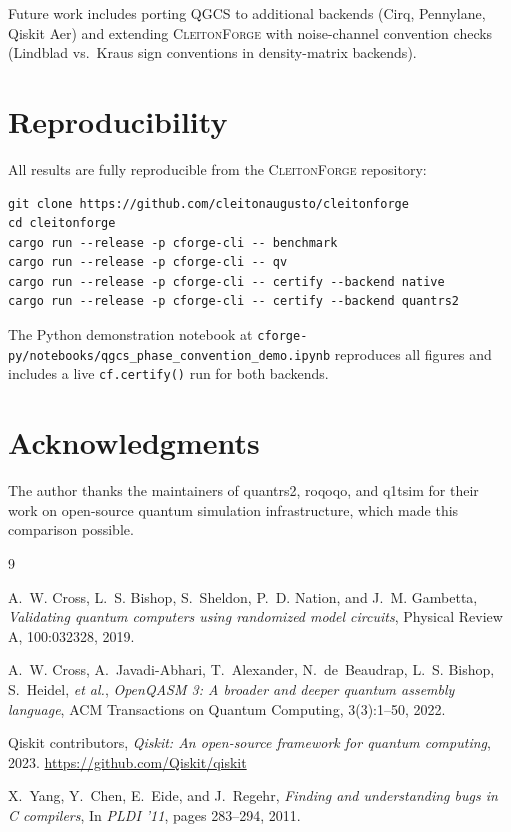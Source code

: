 \documentclass[11pt,a4paper]{article}
\begin{document}
Future work includes porting QGCS to additional backends (Cirq, Pennylane,
Qiskit Aer) and extending \textsc{CleitonForge} with noise-channel convention
checks (Lindblad vs.\ Kraus sign conventions in density-matrix backends).

\section*{Reproducibility}

All results are fully reproducible from the \textsc{CleitonForge} repository:

\begin{lstlisting}[style=rust]
git clone https://github.com/cleitonaugusto/cleitonforge
cd cleitonforge
cargo run --release -p cforge-cli -- benchmark
cargo run --release -p cforge-cli -- qv
cargo run --release -p cforge-cli -- certify --backend native
cargo run --release -p cforge-cli -- certify --backend quantrs2
\end{lstlisting}

The Python demonstration notebook at
\texttt{cforge-py/notebooks/qgcs\_phase\_convention\_demo.ipynb} reproduces
all figures and includes a live \texttt{cf.certify()} run for both backends.

\section*{Acknowledgments}

The author thanks the maintainers of quantrs2, roqoqo, and q1tsim for their
work on open-source quantum simulation infrastructure, which made this
comparison possible.


\begin{thebibliography}{9}

A.~W. Cross, L.~S. Bishop, S.~Sheldon, P.~D. Nation, and J.~M. Gambetta,
\emph{Validating quantum computers using randomized model circuits},
Physical Review A, 100:032328, 2019.

A.~W. Cross, A.~Javadi-Abhari, T.~Alexander, N.~de~Beaudrap, L.~S. Bishop,
S.~Heidel, \emph{et al.},
\emph{OpenQASM 3: A broader and deeper quantum assembly language},
ACM Transactions on Quantum Computing, 3(3):1--50, 2022.

Qiskit contributors,
\emph{Qiskit: An open-source framework for quantum computing}, 2023.
\url{https://github.com/Qiskit/qiskit}

X.~Yang, Y.~Chen, E.~Eide, and J.~Regehr,
\emph{Finding and understanding bugs in C compilers},
In \emph{PLDI '11}, pages 283--294, 2011.

\end{thebibliography}
\end{document}
